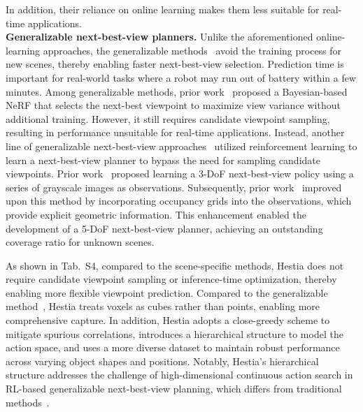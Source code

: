 In addition, their reliance on online learning makes them less suitable for real-time applications. \\
\textbf{Generalizable next-best-view planners.} 
Unlike the aforementioned online-learning approaches, the generalizable methods~\cite{jin2023neu, chen2024gennbv, peralta2020next} avoid the training process for new scenes, thereby enabling faster next-best-view selection. 
Prediction time is important for real-world tasks where a robot may run out of battery within a few minutes.
Among generalizable methods, prior work~\cite{jin2023neu} proposed a Bayesian-based NeRF that selects the next-best viewpoint to maximize view variance without additional training.
However, it still requires candidate viewpoint sampling, resulting in performance unsuitable for real-time applications.
Instead, another line of generalizable next-best-view approaches~\cite{chen2024gennbv, peralta2020next} utilized reinforcement learning to learn a next-best-view planner to bypass the need for sampling candidate viewpoints.
Prior work~\cite{peralta2020next} proposed learning a 3-DoF next-best-view policy using a series of grayscale images as observations.
Subsequently, prior work~\cite{chen2024gennbv} improved upon this method by incorporating occupancy grids into the observations, which provide explicit geometric information. 
This enhancement enabled the development of a 5-DoF next-best-view planner, achieving an outstanding coverage ratio for unknown scenes.

As shown in Tab.~S4, compared to the scene-specific methods, Hestia does not require candidate viewpoint sampling or inference-time optimization, thereby enabling more flexible viewpoint prediction. 
Compared to the generalizable method~\cite{chen2024gennbv}, Hestia treats voxels as cubes rather than points, enabling more comprehensive capture. 
In addition, Hestia adopts a close-greedy scheme to mitigate spurious correlations, introduces a hierarchical structure to model the action space, and uses a more diverse dataset to maintain robust performance across varying object shapes and positions.
Notably, Hestia’s hierarchical structure addresses the challenge of high-dimensional continuous action search in RL-based generalizable next-best-view planning, which differs from traditional methods~\cite{monica2018contour, hardouin2020surface, dai2020fast, zhou2021fuel}.
